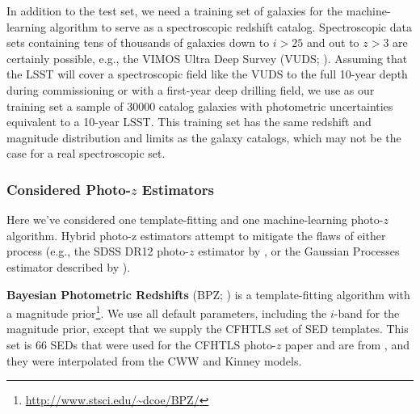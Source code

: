 \documentclass[DM,lsstdraft,toc]{lsstdoc}
\begin{document}
In addition to the test set, we need a training set of galaxies for the machine-learning algorithm to serve as a spectroscopic redshift catalog. Spectroscopic data sets containing tens of thousands of galaxies down to $i>25$ and out to $z>3$ are certainly possible, e.g., the VIMOS Ultra Deep Survey (VUDS; \citealt{2015A&A...576A..79L}). Assuming that the LSST will cover a spectroscopic field like the VUDS to the full 10-year depth during commissioning or with a first-year deep drilling field, we use as our training set a sample of 30000 catalog galaxies with photometric uncertainties equivalent to a 10-year LSST. This training set has the same redshift and magnitude distribution and limits as the galaxy catalogs, which may not be the case for a real spectroscopic set.

\subsubsection{Considered Photo-$z$ Estimators}\label{sssec:sel_ex_estimators}

Here we've considered one template-fitting and one machine-learning photo-$z$ algorithm. Hybrid photo-z estimators attempt to mitigate the flaws of either process (e.g., the SDSS DR12 photo-$z$ estimator by \citet{2016MNRAS.460.1371B}, or the Gaussian Processes estimator described by \citet{2017ApJ...838....5L}).

\textbf{Bayesian Photometric Redshifts} (BPZ; \citealt{2000ApJ...536..571B}) is a template-fitting algorithm with a magnitude prior\footnote{\url{http://www.stsci.edu/~dcoe/BPZ/}}. We use all default parameters, including the $i$-band for the magnitude prior, except that we supply the CFHTLS set of SED templates. This set is 66 SEDs that were used for the CFHTLS photo-$z$ paper and are from \cite{2006A&A...457..841I}, and they were interpolated from the CWW and Kinney models.
\end{document}
